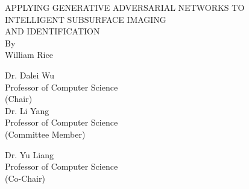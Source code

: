 \begin{titlepage}
    \begin{center}
    \vspace{\baselineskip}
    \vspace{\baselineskip}
    \vspace{\baselineskip}
    \vspace{\baselineskip}
    \vspace{\baselineskip}
    APPLYING GENERATIVE ADVERSARIAL NETWORKS TO \\
    \vspace{\baselineskip}
    INTELLIGENT SUBSURFACE IMAGING\\
    \vspace{\baselineskip}
    AND IDENTIFICATION\\
    \vspace{\baselineskip}
    \vspace{\baselineskip}
    \vspace{\baselineskip}
    \vspace{\baselineskip}
    \vspace{\baselineskip}
    By \\
    \vspace{\baselineskip}
    William Rice\\
    \vspace{\baselineskip}
    \vspace{\baselineskip}
    \vspace{\baselineskip}
    \vspace{\baselineskip}
    \vspace{\baselineskip}
    \singlespacing
    \begin{multicols*}{2}
    
    \raggedright
    Dr. Dalei Wu\\
    Professor of Computer Science\\
    (Chair)\\
    \vspace{\baselineskip}
    Dr. Li Yang \\
    Professor of Computer Science \\
    (Committee Member) \\
    \columnbreak
    
    Dr. Yu Liang\\
    Professor of Computer Science\\
    (Co-Chair) \\
    \end{multicols*}
    
    \end{center}
\end{titlepage}
